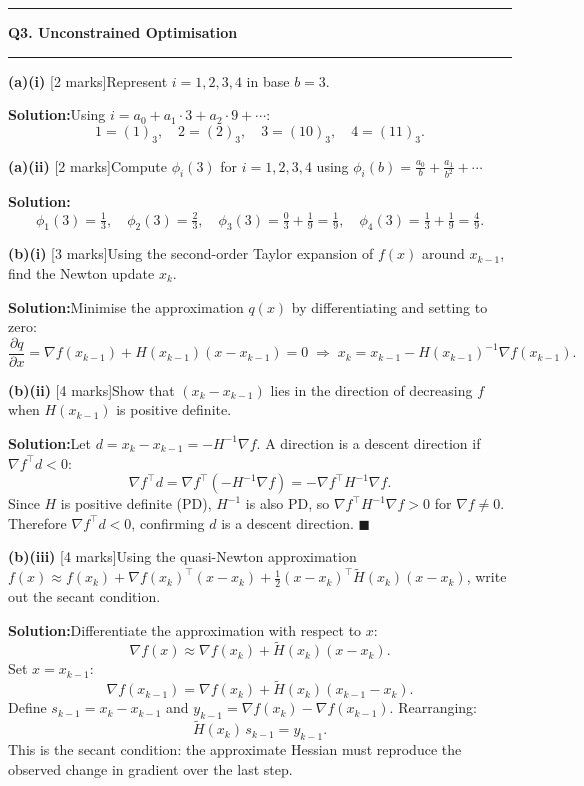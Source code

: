 \documentclass[10pt,a4paper]{article}
\newcommand{\sectitle}[1]{%
  \vspace{8pt}\noindent\rule{\linewidth}{0.8pt}\par\vspace{2pt}%
  {\large\textbf{#1}}\par\vspace{2pt}\rule{\linewidth}{0.4pt}\vspace{4pt}}
\newcommand{\Sol}{\par\vspace{4pt}\noindent\textbf{Solution:}\enspace}
\begin{document}
\sectitle{Q3. Unconstrained Optimisation}

\noindent\textbf{(a)(i)} [2 marks]\quad Represent $i=1,2,3,4$ in base $b=3$.

\Sol Using $i = a_0 + a_1\cdot3 + a_2\cdot9+\cdots$:
\[
  1=(1)_3, \quad 2=(2)_3, \quad 3=(10)_3, \quad 4=(11)_3.
\]

\vspace{4pt}
\noindent\textbf{(a)(ii)} [2 marks]\quad Compute $\phi_i(3)$ for $i=1,2,3,4$
using $\phi_i(b)=\frac{a_0}{b}+\frac{a_1}{b^2}+\cdots$

\Sol
\[
  \phi_1(3)=\tfrac{1}{3},\quad
  \phi_2(3)=\tfrac{2}{3},\quad
  \phi_3(3)=\tfrac{0}{3}+\tfrac{1}{9}=\tfrac{1}{9},\quad
  \phi_4(3)=\tfrac{1}{3}+\tfrac{1}{9}=\tfrac{4}{9}.
\]

\vspace{4pt}
\noindent\textbf{(b)(i)} [3 marks]\quad Using the second-order Taylor expansion
of $f(x)$ around $x_{k-1}$, find the Newton update $x_k$.

\Sol Minimise the approximation $q(x)$ by differentiating and setting to zero:
\[
  \frac{\partial q}{\partial x}
  = \nabla f(x_{k-1}) + H(x_{k-1})(x-x_{k-1}) = 0
  \;\Rightarrow\;
  \boxed{x_k = x_{k-1} - H(x_{k-1})^{-1}\nabla f(x_{k-1})}.
\]

\vspace{4pt}
\noindent\textbf{(b)(ii)} [4 marks]\quad Show that $(x_k-x_{k-1})$ lies in the
direction of decreasing $f$ when $H(x_{k-1})$ is positive definite.

\Sol Let $d = x_k - x_{k-1} = -H^{-1}\nabla f$. A direction is a descent
direction if $\nabla f^\top d < 0$:
\[
  \nabla f^\top d
  = \nabla f^\top(-H^{-1}\nabla f)
  = -\nabla f^\top H^{-1}\nabla f.
\]
Since $H$ is positive definite (PD), $H^{-1}$ is also PD, so
$\nabla f^\top H^{-1}\nabla f > 0$ for $\nabla f\neq0$. Therefore
$\nabla f^\top d < 0$, confirming $d$ is a descent direction. $\blacksquare$

\vspace{4pt}
\noindent\textbf{(b)(iii)} [4 marks]\quad Using the quasi-Newton approximation
$f(x)\approx f(x_k)+\nabla f(x_k)^\top(x-x_k)+\tfrac{1}{2}(x-x_k)^\top
\tilde{H}(x_k)(x-x_k)$, write out the secant condition.

\Sol Differentiate the approximation with respect to $x$:
\[
  \nabla f(x) \approx \nabla f(x_k) + \tilde{H}(x_k)(x - x_k).
\]
Set $x = x_{k-1}$:
\[
  \nabla f(x_{k-1}) = \nabla f(x_k) + \tilde{H}(x_k)(x_{k-1}-x_k).
\]
Define $s_{k-1}=x_k-x_{k-1}$ and $y_{k-1}=\nabla f(x_k)-\nabla f(x_{k-1})$.
Rearranging:
\[
  \boxed{\tilde{H}(x_k)\,s_{k-1} = y_{k-1}.}
\]
This is the secant condition: the approximate Hessian must reproduce the
observed change in gradient over the last step.
\end{document}
